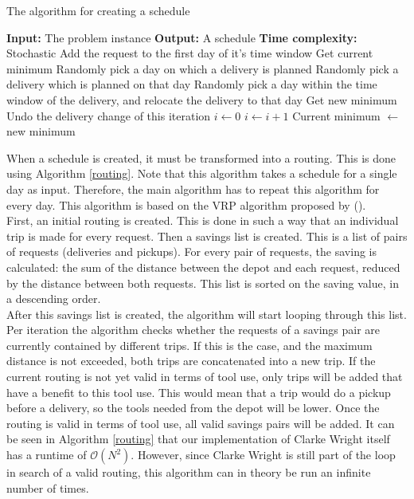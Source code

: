 \documentclass[a4paper]{article}
\begin{document}
\begin{algorithm}
	\caption{The algorithm for creating a schedule}
	\label{schedule}
	\begin{algorithmic}
		\State \textbf{Input:} The problem instance
		\State \textbf{Output:} A schedule
		\State \textbf{Time complexity:} Stochastic
		 
			\State Add the request to the first day of it's time window 
		\EndFor
		\State Get current minimum
		 
			\State Randomly pick a day on which a delivery is planned
			\State Randomly pick a delivery which is planned on that day
			\State Randomly pick a day within the time window of the delivery, and relocate the delivery to that day
			\State Get new minimum
				\State Undo the delivery change of this iteration
			\Else
					\State $i \gets 0$
				\Else
					\State $i \gets i+1$
				\EndIf
				\State Current minimum $\gets$ new minimum
			\EndIf
		\EndWhile
	\end{algorithmic}
\end{algorithm}

When a schedule is created, it must be transformed into a routing. This is done using Algorithm \ref{routing}. Note that this algorithm takes a schedule for a single day as input. Therefore, the main algorithm has to repeat this algorithm for every day. This algorithm is based on the VRP algorithm proposed by \citeauthor{clarkewright1964} (\citeyear{clarkewright1964}). \\
First, an initial routing is created. This is done in such a way that an individual trip is made for every request. Then a savings list is created. This is a list of pairs of requests (deliveries and pickups). For every pair of requests, the saving is calculated: the sum of the distance between the depot and each request, reduced by the distance between both requests. This list is sorted on the saving value, in a descending order. \\
After this savings list is created, the algorithm will start looping through this list. Per iteration the algorithm checks whether the requests of a savings pair are currently contained by different trips. If this is the case, and the maximum distance is not exceeded, both trips are concatenated into a new trip. If the current routing is not yet valid in terms of tool use, only trips will be added that have a benefit to this tool use. This would mean that a trip would do a pickup before a delivery, so the tools needed from the depot will be lower. Once the routing is valid in terms of tool use, all valid savings pairs will be added. It can be seen in Algorithm \ref{routing} that our implementation of Clarke Wright itself has a runtime of $\mathcal{O}(N^2)$. However, since Clarke Wright is still part of the loop in search of a valid routing, this algorithm can in theory be run an infinite number of times. \\
\end{document}
